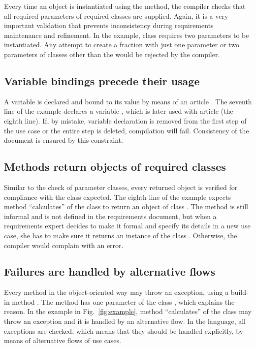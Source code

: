 \documentclass[sigplan,10pt,screen]{acmart}
\begin{document}
Every time an object is instantiated using the  method,
the compiler checks that all required parameters of required classes are
supplied. Again, it is a very important validation that prevents inconsistency
during requirements maintenance and refinement. In the example, class
 requires two parameters to be instantiated. Any attempt to
create a fraction with just one parameter or two parameters of classes other
than the  would be rejected by the compiler.

\subsection{Variable bindings precede their usage}

A variable is declared and bound to its value by means of an article
. The seventh line of the example declares a variable
, which is later used with article  (the eighth
line). If, by mistake, variable declaration is removed from the first step
of the use case or the entire step is deleted, compilation will fail.
Consistency of the document is ensured by this constraint.

\subsection{Methods return objects of required classes}

Similar to the check of parameter classes, every returned object is verified
for compliance with the class expected. The eighth line of the example
expects method ``calculates'' of the class  to return an object
of class . The method is still informal and is not defined in
the requirements document, but when a requirements expert decides to make it
formal and specify its details in a new use case, she has to make sure it
returns an instance of the class . Otherwise, the compiler would
complain with an error.

\subsection{Failures are handled by alternative flows}

Every method in the object-oriented way may throw an exception, using a
build-in method . The method has one parameter of the class
, which explains the reason. In the example in
Fig.~\ref{fig:example}, method ``calculates'' of the class  may
throw an exception and it is handled by an alternative flow. In the language, all
exceptions are checked, which means that they should be handled explicitly,
by means of alternative flows of use cases.
\end{document}
